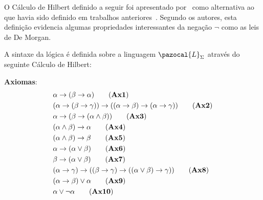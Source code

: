     O Cálculo de Hilbert definido a seguir foi apresentado por~ como alternativa ao que havia sido definido em trabalhos anteriores~\cite{carnielli2000formal,carnielli2007}. Segundo os autores, esta definição evidencia algumas propriedades interessantes da negação $\neg$ como as leis de De Morgan.


    \begin{definicao}[\lfium{}]
        \label{def:lfi1}
        A sintaxe da lógica \lfium{} é definida sobre a linguagem $\pazocal{L}_{\Sigma}$ através do seguinte Cálculo de Hilbert:

        \noindent\textbf{Axiomas}:
        \begin{align*}
            & \alpha \rightarrow (\beta \rightarrow \alpha)\tag{\textbf{Ax1}}                                                                                     \\
            & (\alpha \rightarrow (\beta \rightarrow \gamma)) \rightarrow ((\alpha \rightarrow \beta) \rightarrow (\alpha \rightarrow \gamma ))\tag{\textbf{Ax2}} \\
            & \alpha \rightarrow (\beta \rightarrow (\alpha \land \beta))\tag{\textbf{Ax3}}                                                                       \\
            & (\alpha \land \beta) \rightarrow \alpha\tag{\textbf{Ax4}}                                                                                           \\
            & (\alpha \land \beta) \rightarrow \beta\tag{\textbf{Ax5}}                                                                                            \\
            & \alpha \rightarrow (\alpha \lor \beta)\tag{\textbf{Ax6}}                                                                                            \\
            & \beta \rightarrow (\alpha \lor \beta)\tag{\textbf{Ax7}}                                                                                             \\
            & (\alpha \rightarrow \gamma) \rightarrow ((\beta \rightarrow \gamma) \rightarrow ((\alpha \lor \beta) \rightarrow \gamma))\tag{\textbf{Ax8}}         \\
            & (\alpha \rightarrow \beta) \lor \alpha\tag{\textbf{Ax9}}                                                                                           \\
            & \alpha \lor \neg \alpha\tag{\textbf{Ax10}}                                                                                                          \\

\end{align*}
\end{definicao}
